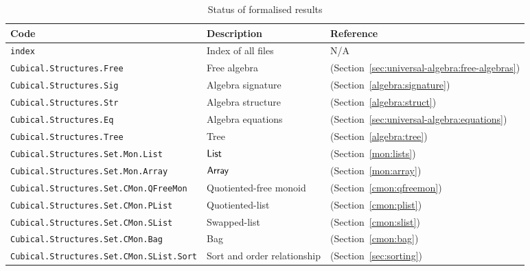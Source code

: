 \begin{toappendix}
    \begin{table}[h]\label{appendix:formalizations}
        \centering
        \begin{tabular}{lll}
            \hline
            \textbf{Code}                                   & \textbf{Description}        & \textbf{Reference}                                   \\ \hline
            \texttt{index}                                  & Index of all files          & N/A                                                  \\
            \texttt{Cubical.Structures.Free}                & Free algebra                & (Section~\cref{sec:universal-algebra:free-algebras}) \\
            \texttt{Cubical.Structures.Sig}                 & Algebra signature           & (Section~\cref{algebra:signature})                   \\
            \texttt{Cubical.Structures.Str}                 & Algebra structure           & (Section~\cref{algebra:struct})                      \\
            \texttt{Cubical.Structures.Eq}                  & Algebra equations           & (Section~\cref{sec:universal-algebra:equations})     \\
            \texttt{Cubical.Structures.Tree}                & Tree                        & (Section~\cref{algebra:tree})                        \\
            \texttt{Cubical.Structures.Set.Mon.List}        & $\operatorname{\mathsf{List}}$               & (Section~\cref{mon:lists})                           \\
            \texttt{Cubical.Structures.Set.Mon.Array}       & $\operatorname{\mathsf{Array}}$              & (Section~\cref{mon:array})                           \\
            \texttt{Cubical.Structures.Set.CMon.QFreeMon}   & Quotiented-free monoid      & (Section~\cref{cmon:qfreemon})                       \\
            \texttt{Cubical.Structures.Set.CMon.PList}      & Quotiented-list             & (Section~\cref{cmon:plist})                          \\
            \texttt{Cubical.Structures.Set.CMon.SList}      & Swapped-list                & (Section~\cref{cmon:slist})                          \\
            \texttt{Cubical.Structures.Set.CMon.Bag}        & Bag                         & (Section~\cref{cmon:bag})                            \\
            \texttt{Cubical.Structures.Set.CMon.SList.Sort} & Sort and order relationship & (Section~\cref{sec:sorting})                         \\
            \hline
        \end{tabular}
        \caption{Status of formalised results}
        \label{tab:formalised_results}
    \end{table}
\end{toappendix}
